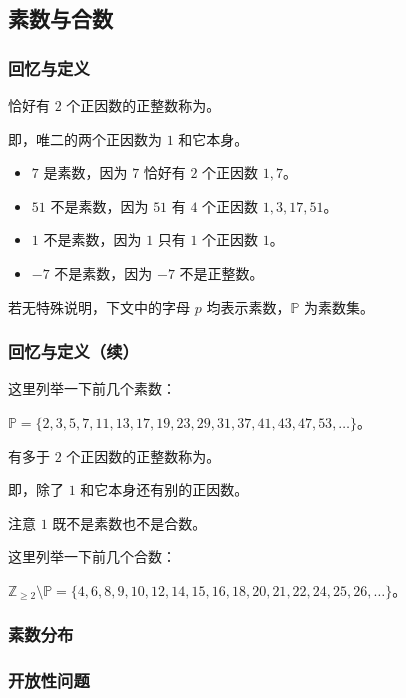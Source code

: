 \subsection{素数与合数}
\begin{frame}[c]
  \progressnow*
\end{frame}
\begin{frame}
  \frametitle{回忆与定义}
  \begin{definition}[素数]
    恰好有 $2$ 个正因数的正整数称为。
    
    即，唯二的两个正因数为 $1$ 和它本身。
  \end{definition}
  \pause
  \begin{examples}[素数]
    \begin{itemize}
      \item $7$ 是素数，因为 $7$ 恰好有 $2$ 个正因数 $1, 7$。
      \item $51$ 不是素数，因为 $51$ 有 $4$ 个正因数 $1, 3, 17, 51$。
      \item $1$ 不是素数，因为 $1$ 只有 $1$ 个正因数 $1$。
      \item $-7$ 不是素数，因为 $-7$ 不是正整数。
    \end{itemize}
  \end{examples}
  \pause
  若无特殊说明，下文中的字母 $p$ 均表示素数，$\mathbb P$ 为素数集。
\end{frame}
\begin{frame}
  \frametitle{回忆与定义（续）}
  这里列举一下前几个素数：
  \begin{center}
    $\mathbb P = \{ 2, 3, 5, 7, 11, 13, 17, 19, 23, 29, 31, 37, 41, 43, 47, 53, \ldots \}$。
  \end{center}
  \pause
  \begin{definition}[合数]
    有多于 $2$ 个正因数的正整数称为。
    
    即，除了 $1$ 和它本身还有别的正因数。
    
    注意 \alert{$1$ 既不是素数也不是合数}。
  \end{definition}
  \pause
  这里列举一下前几个合数：
  \begin{center}
    $\mathbb{Z}_{\ge 2} \setminus \mathbb{P} = \{ 4, 6, 8, 9, 10, 12, 14, 15, 16, 18, 20, 21, 22, 24, 25, 26, \ldots \}$。
  \end{center}
\end{frame}
\begin{frame}
  \frametitle{素数分布}
\end{frame}
\begin{frame}
  \frametitle{开放性问题}
\end{frame}
